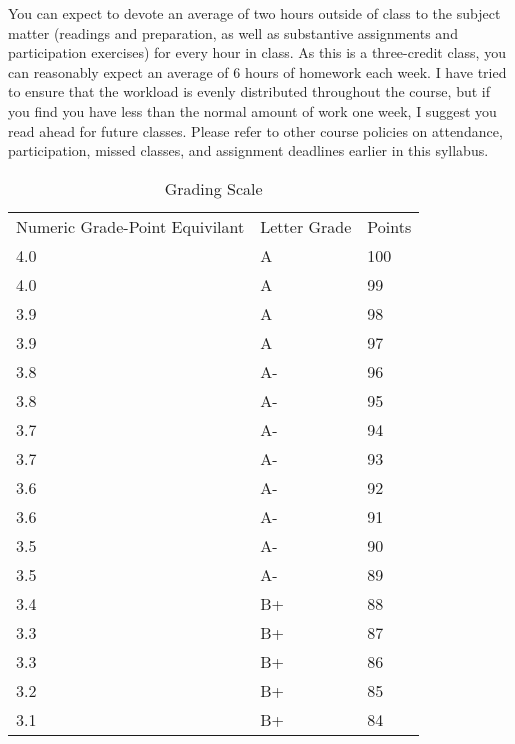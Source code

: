\documentclass[11pt,]{article}
\begin{document}
You can expect to devote an average of two hours outside of class to the
subject matter (readings and preparation, as well as substantive
assignments and participation exercises) for every hour in class. As
this is a three-credit class, you can reasonably expect an average of 6
hours of homework each week. I have tried to ensure that the workload is
evenly distributed throughout the course, but if you find you have less
than the normal amount of work one week, I suggest you read ahead for
future classes. Please refer to other course policies on attendance,
participation, missed classes, and assignment deadlines earlier in this
syllabus.

\begin{table}[]
\centering
\caption{Grading Scale}
\label{my-label}
\begin{tabular}{lll}
Numeric Grade-Point Equivilant & Letter Grade & Points \\
4.0                           & A            & 100    \\
4.0                           & A            & 99     \\
3.9                           & A            & 98     \\
3.9                           & A            & 97     \\
3.8                           & A-           & 96     \\
3.8                           & A-           & 95     \\
3.7                           & A-           & 94     \\
3.7                           & A-           & 93     \\
3.6                           & A-           & 92     \\
3.6                           & A-           & 91     \\
3.5                           & A-           & 90     \\
3.5                           & A-           & 89     \\
3.4                           & B+           & 88     \\
3.3                           & B+           & 87     \\
3.3                           & B+           & 86     \\
3.2                           & B+           & 85     \\
3.1                           & B+           & 84     \\

\end{tabular}
\end{table}
\end{document}
